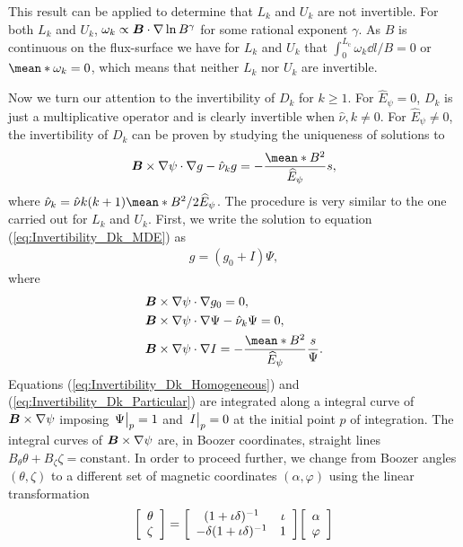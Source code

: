 This result can be applied to determine that $L_k$ and $U_k$ are not invertible. For both $L_k$ and $U_k$, $\omega_k \propto \vb*{B}\cdot\nabla\ln B^\gamma$ for some rational exponent $\gamma$. As $B$ is continuous on the flux-surface we have for $L_k$ and $U_k$ that $\int_{0}^{L_{\text{c}}} \omega_k  {\dd{l}}/{B} =  0$ or $\mean*{\omega_k }=0$, which means that neither $L_k$ nor $U_k$ are invertible. 

Now we turn our attention to the invertibility of $D_k$ for $k\ge 1$. For $\widehat{E}_\psi =0$, $D_k$ is just a multiplicative operator and is clearly invertible when $\hat{\nu}, k\ne0$. For $\widehat{E}_\psi \ne 0$, the invertibility of $D_k$ can be proven by studying the uniqueness of solutions to
\begin{align} 
	\vb*{B}\times\nabla\psi\cdot \nabla g - \hat{\nu}_k g  = - \frac{\mean*{B^2}}{\widehat{E}_\psi} s,
	\label{eq:Invertibility_Dk_MDE}
\end{align}
where $\hat{\nu}_k = \hat{\nu} k (k+1) {\mean*{B^2}}/{2\widehat{E}_\psi}$. The procedure is very similar to the one carried out for $L_k$ and $U_k$. First, we write the solution to equation (\ref{eq:Invertibility_Dk_MDE}) as
%
\begin{align}
	g = ( g_0 + I ) \Psi,
	\label{eq:Invertibility_Dk_Variation_of_Constants}
\end{align}
where
%
\begin{align}
	& \vb*{B}\times\nabla\psi\cdot \nabla g_0 = 0,  \label{eq:Invertibility_Dk_constant}
	\\
	& \vb*{B}\times\nabla\psi\cdot \nabla \Psi - \hat{\nu}_k \Psi = 0,  \label{eq:Invertibility_Dk_Homogeneous}
	\\
	& \vb*{B}\times\nabla\psi\cdot \nabla I = - \frac{\mean*{B^2}}{\widehat{E}_\psi}\frac{s}{\Psi}.  \label{eq:Invertibility_Dk_Particular}
\end{align}
Equations (\ref{eq:Invertibility_Dk_Homogeneous}) and (\ref{eq:Invertibility_Dk_Particular}) are integrated along a integral curve of $\vb*{B}\times\nabla\psi$ imposing $\eval{\Psi}_{p}=1$ and $\eval{I}_{p}=0$ at the initial point $p$ of integration. The integral curves of $\vb*{B}\times\nabla\psi$ are, in Boozer coordinates, straight lines $B_\theta \theta + B_\zeta \zeta = \text{constant}$. In order to proceed further, we change from Boozer angles $(\theta,\zeta)$ to a different set of magnetic coordinates $(\alpha,\varphi)$ using the linear transformation
%
\begin{align}
	\Matrix{c}{\theta \\ \zeta}
	=
	\Matrix{cc}
	{
		(1 + \iota \delta)^{-1}	 &  \iota\\ 
		-\delta(1 + \iota \delta)^{-1}	 &  1
	}
	\Matrix{c}{\alpha \\ \varphi}
	\label{eq:Invertibility_Magnetic_Coordinates_Dk}
\end{align}

